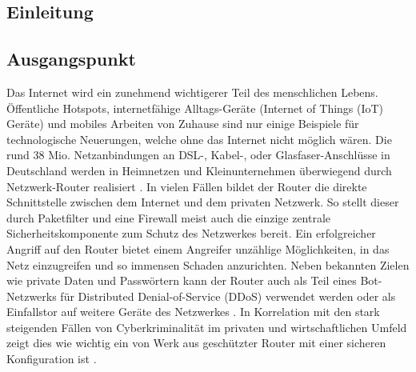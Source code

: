 \documentclass[a4paper]{book}
\begin{document}
\begin{large}

\chapter{Einleitung}

\section{Ausgangspunkt}

\begin{onehalfspace}
Das Internet wird ein zunehmend wichtigerer Teil des menschlichen Lebens. Öffentliche Hotspots, internetfähige Alltags-Geräte (Internet of Things (IoT) Geräte) und mobiles \mbox Arbeiten von Zuhause sind nur einige Beispiele für technologische Neuerungen, welche \mbox ohne das Internet nicht möglich wären. Die rund 38 Mio. Netzanbindungen an DSL-, Kabel-, oder Glasfaser-Anschlüsse in Deutschland werden in Heimnetzen und Kleinunternehmen überwiegend durch Netzwerk-Router realisiert \cite{StatistischesBundesamt.2020}. In vielen Fällen bildet der Router die direkte Schnittstelle zwischen dem Internet und dem privaten Netzwerk. So stellt dieser durch Paketfilter und eine Firewall meist auch die einzige zentrale Sicherheitskomponente zum Schutz des Netzwerkes bereit. Ein erfolgreicher Angriff auf den Router bietet einem Angreifer unzählige Möglichkeiten, in das Netz einzugreifen und so immensen Schaden anzurichten. Neben bekannten Zielen wie private Daten und Passwörtern kann der Router auch als Teil eines Bot-Netzwerks für\mbox{} Distributed Denial-of-Service (DDoS) verwendet werden oder als Einfallstor auf \mbox weitere Geräte des Netzwerkes \cite{Triantopoulou.15.07.201917.07.2019}. In Korrelation mit den stark steigenden Fällen von Cyber\-kriminalität im privaten und wirtschaftlichen Umfeld zeigt dies wie wichtig ein von Werk aus geschützter Router mit einer sicheren Konfiguration ist  \cite{BundesamtfurSicherheitinderInformationstechnik.2020}.

\end{onehalfspace}
\end{large}
\end{document}
